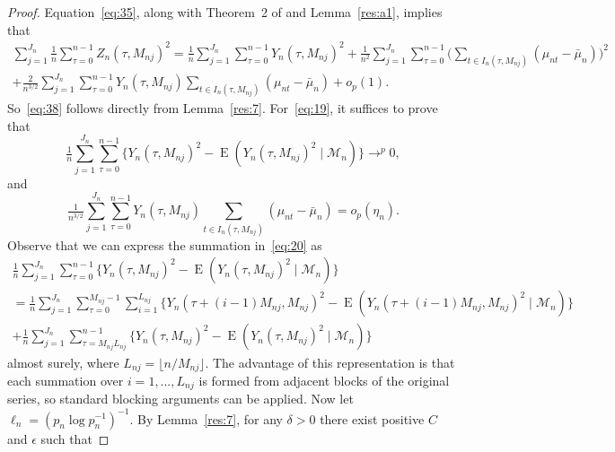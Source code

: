 \documentclass[11pt]{article}
\theoremstyle{definition}
\DeclareMathOperator{\E}{E}
\begin{document}
\begin{proof} 
  Equation~\eqref{eq:35}, along with Theorem~2 of \citet{Jon:97} and
  Lemma~\ref{res:a1}, implies that
  \begin{multline*}
    \label{eq:52}
    \sum_{j=1}^{J_n} \tfrac{1}{n} \sum_{\tau=0}^{n-1} Z_n(\tau,
    M_{nj})^2 = \tfrac{1}{n} \sum_{j=1}^{J_n} \sum_{\tau=0}^{n-1}
    Y_n(\tau, M_{nj})^2 + \tfrac{1}{n^2} \sum_{j=1}^{J_n}
    \sum_{\tau=0}^{n-1} \Big(\sum_{t \in I_n(\tau, M_{nj})} (\mu_{nt} - \bar{\mu}_n)\Big)^2 \\
    + \tfrac{2}{n^{3/2}} \sum_{j=1}^{J_n} \sum_{\tau=0}^{n-1}
    Y_n(\tau, M_{nj}) \sum_{t\in I_n(\tau, M_{nj})} (\mu_{nt} -
    \bar{\mu}_n) + o_p(1).
  \end{multline*}
  So~\eqref{eq:38} follows directly from Lemma~\ref{res:7}.
  For~\eqref{eq:19}, it suffices to prove that
  \begin{equation}
    \label{eq:20}
    \tfrac{1}{n} \sum_{j=1}^{J_n} \sum_{\tau=0}^{n-1} \big\{Y_n(\tau,
    M_{nj})^2 - \E(Y_n(\tau, M_{nj})^2 \mid \mathcal{M}_n) \big\} \to^p 0,
  \end{equation}
  and
  \begin{equation}
    \label{eq:51}
    \tfrac{1}{n^{3/2}} \sum_{j=1}^{J_n} \sum_{\tau=0}^{n-1}
    Y_{n}(\tau, M_{nj})\sum_{t\in I_n(\tau, M_{nj})}(\mu_{nt} -
    \bar{\mu}_n) = o_p(\eta_n).
  \end{equation}
  Observe that we can express the summation in~\eqref{eq:20} as
  \begin{multline}\label{eq:47}
    \tfrac{1}{n} \sum_{j=1}^{J_n} \sum_{\tau=0}^{n-1} \big\{Y_n(\tau,
    M_{nj})^2 - \E(Y_n(\tau, M_{nj})^2 \mid \mathcal{M}_n) \big\} \\ =
    \tfrac{1}{n} \sum_{j=1}^{J_n} \sum_{\tau=0}^{M_{nj}-1}
    \sum_{i=1}^{L_{nj}}\big\{ Y_n(\tau+(i-1)M_{nj}, M_{nj})^2
    - \E(Y_n(\tau+(i-1)M_{nj}, M_{nj})^2 \mid
    \mathcal{M}_n)\big\} \\ + \tfrac{1}{n} \sum_{j=1}^{J_n}
    \sum_{\tau= M_{nj}L_{nj}}^{n-1} \big\{Y_{n}(\tau, M_{nj})^2 -
    \E(Y_n(\tau, M_{nj})^2 \mid \mathcal{M}_n)\big\}
  \end{multline}
  almost surely, where $L_{nj} = \lfloor n/ M_{nj} \rfloor$.  The
  advantage of this representation is that each summation over
  $i=1,\dots,L_{nj}$ is formed from adjacent blocks of the original
  series, so standard blocking arguments can be applied.  Now let
  $\ell_n = (p_n \log p_n^{-1})^{-1}$. By Lemma~\ref{res:7}, for any
  $\delta > 0$ there exist positive $C$ and $\epsilon$ such that

\end{proof}
\end{document}
